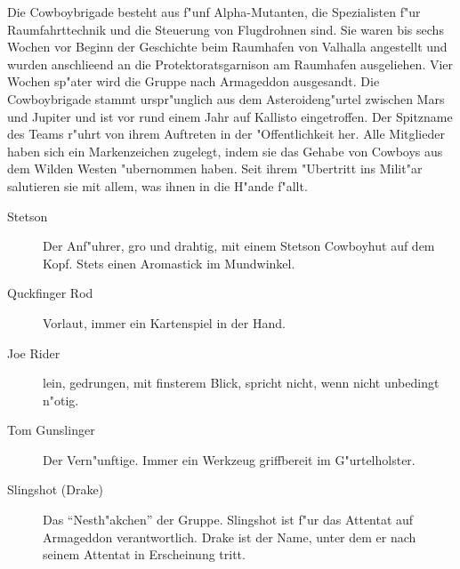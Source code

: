 
Die Cowboybrigade besteht aus f"unf Alpha-Mutanten, die Spezialisten f"ur Raumfahrttechnik und die Steuerung von Flugdrohnen sind. Sie waren bis sechs Wochen vor Beginn der Geschichte beim Raumhafen von Valhalla angestellt und wurden anschlie\3end an die Protektoratsgarnison am Raumhafen ausgeliehen. Vier Wochen sp"ater wird die Gruppe nach Armageddon ausgesandt. Die Cowboybrigade stammt urspr"unglich aus dem Asteroideng"urtel zwischen Mars und Jupiter und ist vor rund einem Jahr auf Kallisto eingetroffen. Der Spitzname des Teams r"uhrt von ihrem Auftreten in der "Offentlichkeit her. Alle Mitglieder haben sich ein Markenzeichen zugelegt, indem sie das Gehabe von Cowboys aus dem Wilden Westen "ubernommen haben. Seit ihrem "Ubertritt ins Milit"ar salutieren sie mit allem, was ihnen in die H"ande f"allt.

\begin{description}
    \item[Stetson] Der Anf"uhrer, gro\3 und drahtig, mit einem Stetson Cowboyhut auf dem Kopf. Stets einen Aromastick im Mundwinkel.
    \item[Quckfinger Rod] Vorlaut, immer ein Kartenspiel in der Hand.
    \item[Joe Rider] lein, gedrungen, mit finsterem Blick, spricht nicht, wenn nicht unbedingt n"otig.
    \item[Tom Gunslinger] Der Vern"unftige. Immer ein Werkzeug griffbereit im G"urtelholster.
    \item[Slingshot (Drake)]  Das "`Nesth"akchen"' der Gruppe. Slingshot ist f"ur das Attentat auf Armageddon verantwortlich. Drake ist der 
        Name, unter dem er nach seinem Attentat in Erscheinung tritt.
\end{description}

\newpage
